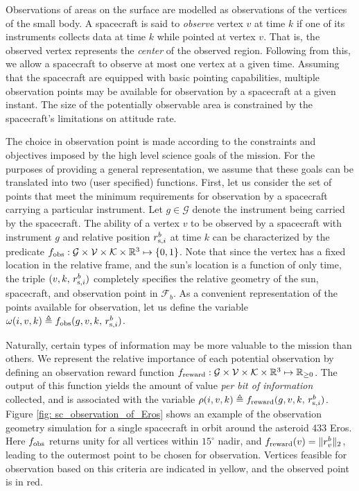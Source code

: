 \documentclass[letterpaper, 10 pt, conference]{ieeeconf}  %
\theoremstyle{definition}
\begin{document}
Observations of areas on the surface are modelled as observations of the vertices of the small body. A spacecraft is said to \textit{observe} vertex $v$ at time $k$ if one of its instruments collects data at time $k$ while pointed at vertex $v$. That is, the observed vertex represents the \textit{center} of the observed region. Following from this, we allow a spacecraft to observe at most one vertex at a given time. 
Assuming that the spacecraft are equipped with basic pointing capabilities, multiple observation points may be available for observation by a spacecraft at a given instant. The size of the potentially observable area is constrained by the spacecraft's limitations on attitude rate. 

The choice in observation point is made according to the constraints and objectives imposed by the high level science goals of the mission. For the purposes of providing a general representation, we assume that these goals can be translated into two (user specified) functions. First, let us consider the set of points that meet the minimum requirements for observation by a spacecraft carrying a particular instrument. Let $g\in\mathcal{G}$ denote the instrument being carried by the spacecraft.  
The ability of a vertex $v$ to be observed by a spacecraft with instrument $g$ and relative position $r_{{\rm s},i}^{b}$ at time $k$ can be characterized by the predicate
$f_{\rm obs}:\mathcal{G}\times\mathcal{V}\times\mathcal{K}\times\mathbb{R}^3\mapsto \{0,1\}$. Note that since the vertex has a fixed location in the relative frame, and the sun's location is a function of only time, the triple $(v,k,\,r_{{\rm s},i}^b)$ completely specifies the relative geometry of the sun, spacecraft, and observation point in $\mathcal{F}_b$.  As a convenient representation of the points available for observation, let us define the variable $\omega(i,v,k) \triangleq f_{\rm obs}(g,v,k,\,r_{{\rm s},i}^b)$.

Naturally, certain types of information may be more valuable to the mission than others. We represent the relative importance of each potential observation by defining an observation reward function $f_{\rm reward}:\mathcal{G}\times\mathcal{V}\times\mathcal{K}\times\mathbb{R}^3\mapsto \mathbb{R}_{\geq 0}$. The output of this function yields the amount of value \textit{per bit of information} collected, and is associated with the variable $\rho(i,v,k) \triangleq f_{\rm reward}(g,v,k,\,r_{{\rm s},i}^b)$. Figure \ref{fig: sc_observation_of_Eros} shows an example of the observation geometry simulation for a single spacecraft in orbit around the asteroid 433 Eros. 
Here $f_{\rm obs}$ returns unity for all vertices within $15^\circ$ nadir, and $f_{\rm reward}(v)=\Vert r_v^b \Vert_2 $, leading to the outermost point to be chosen for observation. Vertices feasible for observation based on this criteria are indicated in yellow, and the observed point is in red.
\end{document}

